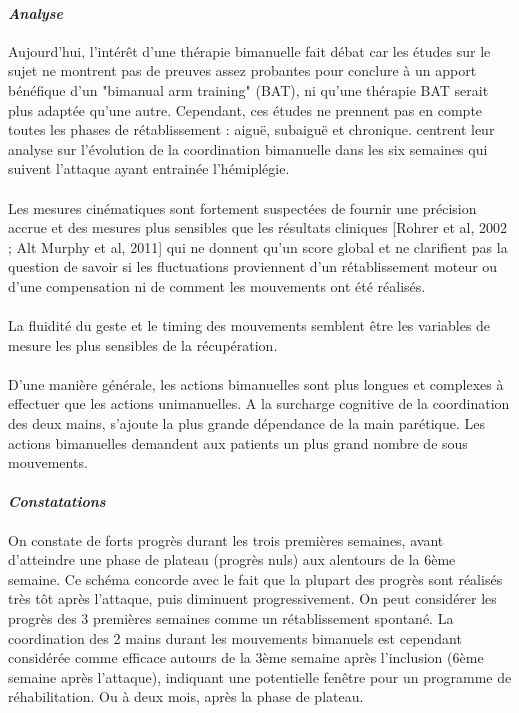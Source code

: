 		\paragraph{\emph{Analyse}\\}
Aujourd'hui, l'intérêt d'une thérapie bimanuelle fait débat car les études sur le sujet ne montrent pas de preuves assez probantes pour conclure à un apport bénéfique d'un "bimanual arm training" (BAT), ni qu'une thérapie BAT serait plus adaptée qu'une autre. Cependant, ces études ne prennent pas en compte toutes les phases de rétablissement : aiguë, subaiguë et chronique.\newline
[Metrot et al, 2013]\cite{Metr13} centrent leur analyse sur l'évolution de la coordination bimanuelle dans les six semaines qui suivent l'attaque ayant entrainée l'hémiplégie.

\paragraph{}
Les mesures cinématiques sont fortement suspectées de fournir une précision accrue et des mesures plus sensibles que les résultats cliniques [Rohrer et al, 2002 ; Alt Murphy et al, 2011] qui ne donnent qu'un score global et ne clarifient pas la question de savoir si les fluctuations proviennent d'un rétablissement moteur ou d'une compensation ni de comment les mouvements ont été réalisés. 

\paragraph{}
La fluidité du geste et le timing des mouvements semblent être les variables de mesure les plus
sensibles de la récupération.

\paragraph{}
D'une manière générale, les actions bimanuelles sont plus longues et complexes à effectuer que les actions unimanuelles. A la surcharge cognitive de la coordination des deux mains, s'ajoute la plus grande dépendance de la main parétique. Les actions bimanuelles demandent aux patients un plus grand nombre de sous mouvements. 

		\paragraph{\emph{Constatations}\\}
On constate de forts progrès durant les trois premières semaines, avant d'atteindre une phase de plateau (progrès nuls) aux alentours de la 6ème semaine. Ce schéma concorde avec le fait que la plupart des progrès sont réalisés très tôt après l'attaque, puis diminuent progressivement. On peut considérer les progrès des 3 premières semaines comme un rétablissement spontané. La coordination des 2 mains durant les mouvements bimanuels est cependant considérée comme efficace autours de la 3ème semaine après l'inclusion (6ème semaine après l'attaque), indiquant une potentielle fenêtre pour un programme de réhabilitation. Ou à deux mois, après la phase de plateau.		

